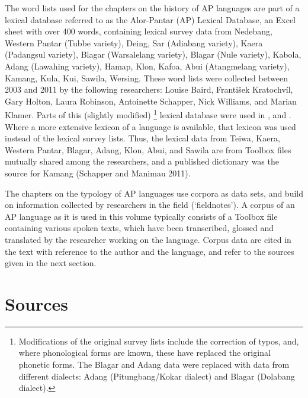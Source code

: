 \clearpage 
The word lists used for the chapters on the history of AP languages are part of a lexical database referred to as the Alor-Pantar (AP) Lexical Database, an Excel sheet with over  400 words, containing lexical survey data from Nedebang, Western Pantar (Tubbe variety), Deing, Sar (Adiabang variety), Kaera (Padangsul variety), Blagar (Warsalelang variety), Blagar (Nule variety), Kabola, Adang (Lawahing variety), Hamap, Klon, Kafoa, Abui (Atangmelang variety), Kamang, Kula, Kui, Sawila, Wersing. These word lists were collected between 2003 and 2011 by the following researchers: Louise Baird, Franti\v{s}ek Kratochv\'il, Gary Holton, Laura Robinson, Antoinette Schapper, Nick Williams, and Marian Klamer. Parts of this (slightly modified){} \footnote{Modifications of the original survey lists include the correction of typos, and, where phonological forms are known, these have replaced the original phonetic forms. The Blagar and Adang data were replaced with data from different dialects: Adang (Pitungbang/Kokar dialect) and Blagar (Dolabang dialect).} lexical database were used in \citet{HoltonRobinsonTVhistory,HoltonRobinsonTVposition}, and \citet{SchapperEtAlTVtimor}. Where a more extensive lexicon of a language is available, that lexicon was used instead of the lexical survey lists. Thus, the lexical data from Teiwa, Kaera, Western Pantar, Blagar, Adang, Klon, Abui, and Sawila are from Toolbox files mutually shared among the researchers, and a published dictionary was the source for Kamang (Schapper and Manimau 2011).  

The chapters on the typology of AP languages use corpora as data sets, and build on information collected by researchers in the field (`fieldnotes'). A corpus of an AP language as it is used in this volume typically consists of a Toolbox file containing various spoken texts, which have been transcribed, glossed and translated by the researcher working on the language. Corpus data are cited in the text with reference to the author and the language, and refer to the  sources given in the next section.
 
\section*{Sources}
 
